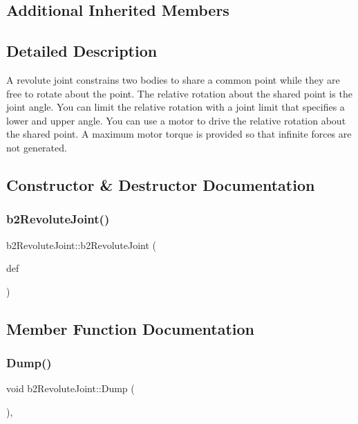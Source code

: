 \subsection*{Additional Inherited Members}


\subsection{Detailed Description}
A revolute joint constrains two bodies to share a common point while they are free to rotate about the point. The relative rotation about the shared point is the joint angle. You can limit the relative rotation with a joint limit that specifies a lower and upper angle. You can use a motor to drive the relative rotation about the shared point. A maximum motor torque is provided so that infinite forces are not generated. 

\subsection{Constructor \& Destructor Documentation}
\mbox{\label{classb2_revolute_joint_a2571c1438e909fb3518de6f88bb29e01}} 
\subsubsection{\texorpdfstring{b2RevoluteJoint()}{b2RevoluteJoint()}}
{\footnotesize\ttfamily b2\+Revolute\+Joint\+::b2\+Revolute\+Joint (\begin{DoxyParamCaption}\item[{const \mbox{\hyperlink{structb2_revolute_joint_def}{b2\+Revolute\+Joint\+Def}} $\ast$}]{def }\end{DoxyParamCaption})\hspace{0.3cm}{\ttfamily [protected]}}



\subsection{Member Function Documentation}
\mbox{\label{classb2_revolute_joint_a408badabe21b169412a5c4a2f36bbbd8}} 
\subsubsection{\texorpdfstring{Dump()}{Dump()}}
{\footnotesize\ttfamily void b2\+Revolute\+Joint\+::\+Dump (\begin{DoxyParamCaption}{ }\end{DoxyParamCaption})\hspace{0.3cm}{\ttfamily [override]}, {\ttfamily [virtual]}}



